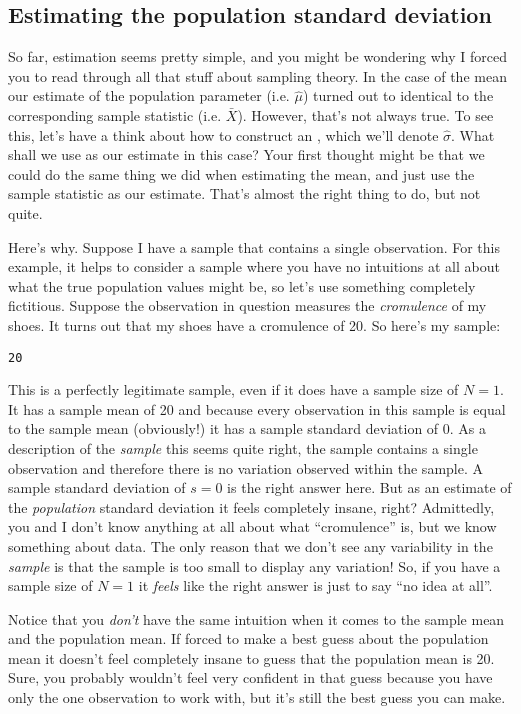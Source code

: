 \subsection{Estimating the population standard deviation}

So far, estimation seems pretty simple, and you might be wondering why I forced you to read through all that stuff about sampling theory. In the case of the mean our estimate of the population parameter (i.e. $\hat\mu$) turned out to identical to the corresponding sample statistic (i.e. $\bar{X}$). However, that's not always true. To see this, let's have a think about how to construct an , which we'll denote  $\hat\sigma$. What shall we use as our estimate in this case? Your first thought might be that we could do the same thing we did when estimating the mean, and just use the sample statistic as our estimate. That's almost the right thing to do, but not quite. 

Here's why. Suppose I have a sample that contains a single observation. For this example, it helps to consider a sample where you have no intuitions at all about what the true population values might be, so let's use something completely fictitious. Suppose the observation in question measures the {\it cromulence} of my shoes. It turns out that my shoes have a cromulence of 20. So here's my sample:
\begin{center}
\texttt{20}
\end{center}
This is a perfectly legitimate sample, even if it does have a sample size of $N=1$. It has a sample mean of 20 and because every observation in this sample is equal to the sample mean (obviously!) it has a sample standard deviation of 0. As a description of the {\it sample} this seems quite right, the sample contains a single observation and therefore there is no variation observed within the sample. A sample standard deviation of $s = 0$ is the right answer here. But as an estimate of the {\it population} standard deviation it feels completely insane, right? Admittedly, you and I don't know anything at all about what ``cromulence'' is, but we know something about data. The only reason that we don't see any variability in the {\it sample} is that the sample is too small to display any variation! So, if you have a sample size of $N=1$ it {\it feels} like the right answer is just to say ``no idea at all''. 

Notice that you {\it don't} have the same intuition when it comes to the sample mean and the population mean. If forced to make a best guess about the population mean it doesn't feel completely insane to guess that the population mean is 20. Sure, you probably wouldn't feel very confident in that guess because you have only the one observation to work with, but it's still the best guess you can make. 

